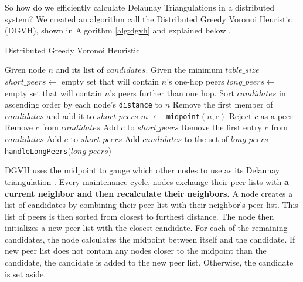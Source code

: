 \documentclass[11pt,conference]{IEEEtran}
\begin{document}
So how do we efficiently calculate Delaunay Triangulations in a distributed system?
We created an algorithm call the Distributed Greedy Voronoi Heuristic (DGVH), shown in Algorithm \ref{alg:dgvh} and explained below \cite{dgvh}.


\begin{algorithm} %
	\caption{Distributed Greedy Voronoi Heuristic}
	\label{alg:dgvh}
	\begin{algorithmic}[1]  %
		\STATE Given node $n$ and its list of $candidates$.
		\STATE Given the minimum $table\_size$
		\STATE $short\_peers \leftarrow$ empty set that will contain $n$'s one-hop peers
		\STATE $long\_peers \leftarrow$ empty set that will contain $n$'s peers further than one hop.
		\STATE Sort $candidates$ in ascending order by each node's \texttt{distance} to $n$
		\STATE Remove the first member of $candidates$ and add it to $short\_peers$
			\STATE $m$ $ \leftarrow $ \texttt{midpoint}$( n, c )$
				\STATE Reject $c$ as a peer
			\ELSE
				\STATE Remove $c$ from $candidates$
				\STATE Add $c$ to $short\_peers$
			\ENDIF
		\ENDFOR
			\STATE Remove the first entry $c$ from $candidates$
			\STATE Add $c$ to $short\_peers$
		\ENDWHILE
		\STATE Add $candidates$ to the set of $long\_peers$	
		\STATE \texttt{handleLongPeers}($long\_peers$)
	\end{algorithmic}
\end{algorithm} 

DGVH uses the midpoint to gauge which other nodes to use as its Delaunay triangulation \cite{dgvh}.
Every maintenance cycle, nodes exchange their peer lists with\textbf{ a current neighbor and then recalculate their neighbors.  }
A node creates a list of candidates by combining their peer list with  their neighbor's peer list.
This list of peers is then sorted from closest to furthest distance.
The node then initializes a new peer list with the closest candidate.
For each of the remaining candidates, the node calculates the midpoint between itself and the candidate.
If new peer list does not contain any nodes closer to the midpoint than the candidate, the candidate is added to the new peer list.
Otherwise, the candidate is set aside.
\end{document}
